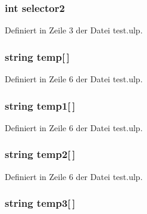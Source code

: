 \subsubsection[{selector2}]{\setlength{\rightskip}{0pt plus 5cm}int selector2}\label{test_8ulp_acb22ea06df7a98062b750ecca56f1628}


Definiert in Zeile 3 der Datei test.\+ulp.

\hypertarget{test_8ulp_a2f8d954bdd72eba003a9802a6248de83}{}
\subsubsection[{temp}]{\setlength{\rightskip}{0pt plus 5cm}string temp\mbox{[}$\,$\mbox{]}}\label{test_8ulp_a2f8d954bdd72eba003a9802a6248de83}


Definiert in Zeile 6 der Datei test.\+ulp.

\hypertarget{test_8ulp_a1739e013da948312edaaa3ade1bd7f7a}{}
\subsubsection[{temp1}]{\setlength{\rightskip}{0pt plus 5cm}string temp1\mbox{[}$\,$\mbox{]}}\label{test_8ulp_a1739e013da948312edaaa3ade1bd7f7a}


Definiert in Zeile 6 der Datei test.\+ulp.

\hypertarget{test_8ulp_a93cd3f3f743b20e134149e06efa22a88}{}
\subsubsection[{temp2}]{\setlength{\rightskip}{0pt plus 5cm}string temp2\mbox{[}$\,$\mbox{]}}\label{test_8ulp_a93cd3f3f743b20e134149e06efa22a88}


Definiert in Zeile 6 der Datei test.\+ulp.

\hypertarget{test_8ulp_a6d07a7b1d2f2bb3e3061eba3b676dd44}{}
\subsubsection[{temp3}]{\setlength{\rightskip}{0pt plus 5cm}string temp3\mbox{[}$\,$\mbox{]}}\label{test_8ulp_a6d07a7b1d2f2bb3e3061eba3b676dd44}



